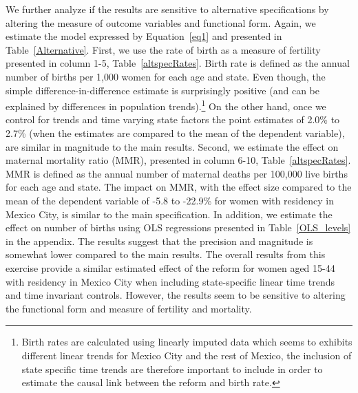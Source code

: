 \documentclass[a4paper, 11pt]{article}
\begin{document}
\begin{spacing}{2}
We further analyze if the results are sensitive to alternative specifications by altering the measure of outcome variables and functional form. Again, we estimate the model expressed by Equation~\eqref{eq1} and presented in Table~\ref{Alternative}. First, we use the rate of birth as a measure of fertility presented in  column 1-5, Table~\ref{altspecRates}. Birth rate is defined as the annual number of births per 1,000 women for each age and state. Even though, the simple difference-in-difference estimate is surprisingly positive (and can be explained by differences in population trends).\footnote{Birth rates are calculated using linearly imputed data which seems to exhibits different linear trends for Mexico City and the rest of Mexico, the inclusion of state specific time trends are therefore important to include in order to estimate the causal link between the reform and birth rate.} On the other hand, once we control for trends and time varying state factors the point estimates of 2.0\% to 2.7\% (when the estimates are compared to the mean of the dependent variable), are similar in magnitude to the main results. Second, we estimate the effect on maternal mortality ratio (MMR), presented in column 6-10, Table~\ref{altspecRates}. MMR is defined as the annual number of maternal deaths per 100,000 live births for each age and state. The impact on MMR, with the effect size compared to the mean of the dependent variable of -5.8 to -22.9\% for women with residency in Mexico City, is similar to the main specification. In addition, we estimate the effect on number of births using OLS regressions presented in Table~\ref{OLS_levels} in the appendix. The results suggest that the precision and magnitude is somewhat lower compared to the main results. The overall results from this exercise provide a similar estimated effect of the reform for women aged 15-44 with residency in Mexico City when including state-specific linear time trends and time invariant controls. However, the results seem to be sensitive to altering the functional form and measure of fertility and mortality. 


\end{spacing}
\end{document}
